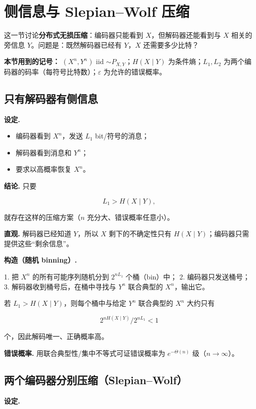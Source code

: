 \section{侧信息与 Slepian–Wolf 压缩}


这一节讨论\textbf{分布式无损压缩}：编码器只能看到 $X$，但解码器还能看到与 $X$ 相关的旁信息 $Y$。问题是：既然解码器已经有 $Y$，$X$ 还需要多少比特？

\textbf{本节用到的记号：} $(X^n,Y^n)$ iid $\sim P_{X,Y}$；$H(X\mid Y)$ 为条件熵；$L_1,L_2$ 为两个编码器的码率（每符号比特数）；$\varepsilon$ 为允许的错误概率。

\subsection{只有解码器有侧信息}


\textbf{设定.}

\begin{itemize}
\item 编码器看到 $X^n$，发送 $L_1$ bit/符号的消息；
\item 解码器看到消息和 $Y^n$；
\item 要求以高概率恢复 $X^n$。
\end{itemize}


\textbf{结论.} 只要

\[
L_1>H(X\mid Y),
\]

就存在这样的压缩方案（$n$ 充分大、错误概率任意小）。

\textbf{直观.} 解码器已经知道 $Y$，所以 $X$ 剩下的不确定性只有 $H(X\mid Y)$；编码器只需提供这些“剩余信息”。

\textbf{构造（随机 binning）.}

1. 把 $X^n$ 的所有可能序列随机分到 $2^{nL_1}$ 个桶（bin）中；
2. 编码器只发送桶号；
3. 解码器收到桶号后，在桶中寻找与 $Y^n$ 联合典型的 $X^n$，输出它。

若 $L_1>H(X\mid Y)$，则每个桶中与给定 $Y^n$ 联合典型的 $X^n$ 大约只有

\[
2^{nH(X\mid Y)}/2^{nL_1}<1
\]

个，因此解码唯一、正确概率高。

\textbf{错误概率.} 用联合典型性/集中不等式可证错误概率为 $e^{-\Theta(n)}$ 级（$n\to\infty$）。

\subsection{两个编码器分别压缩（Slepian–Wolf）}


\textbf{设定.}

